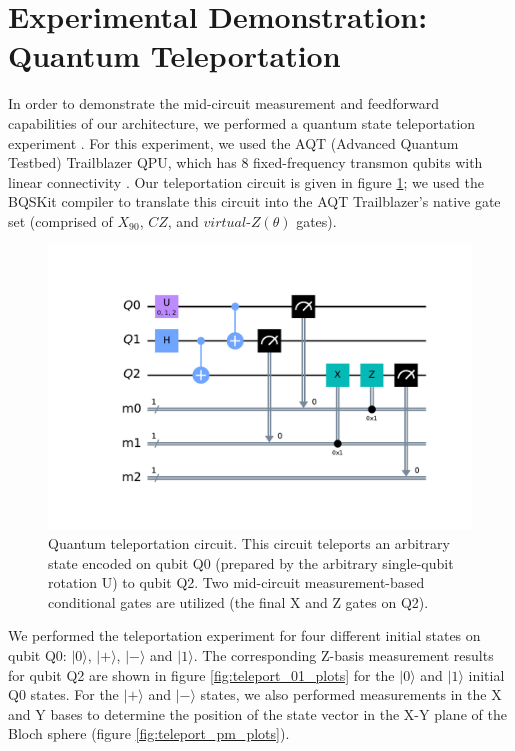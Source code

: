 \documentclass[journal]{IEEEtran}
\begin{document}
\section{Experimental Demonstration: Quantum Teleportation}

In order to demonstrate the mid-circuit measurement and feedforward capabilities of our architecture, we performed a quantum state teleportation experiment \cite{bennett1993teleporting}. For this experiment, we used the AQT (Advanced Quantum Testbed) Trailblazer QPU, which has 8 fixed-frequency transmon qubits with linear connectivity \cite{kreikebaum2020improving}. Our teleportation circuit is given in figure \ref{fig:teleport_circuit}; we used the BQSKit compiler \cite{younis2021bqskit} to translate this circuit into the AQT Trailblazer's native gate set (comprised of $X_{90}$, $CZ$, and $virtual$-$Z(\theta)$ gates).

\begin{figure}
    \centering
    \includegraphics[scale=0.5, trim={60 50 20 50}, clip]{figures/teleport_circuit.pdf}
    \caption{Quantum teleportation circuit. This circuit teleports an arbitrary state encoded on qubit Q0 (prepared by the arbitrary single-qubit rotation U) to qubit Q2. Two mid-circuit measurement-based conditional gates are utilized (the final X and Z gates on Q2).}
    \label{fig:teleport_circuit}
\end{figure}

We performed the teleportation experiment for four different initial states on qubit Q0: $| 0 \rangle$, $| + \rangle$, $| - \rangle$ and $| 1 \rangle$. The corresponding Z-basis measurement results for qubit Q2 are shown in figure \ref{fig:teleport_01_plots} for the $|0 \rangle$ and $|1 \rangle$ initial Q0 states. For the $| + \rangle$ and $| - \rangle$ states, we also performed measurements in the X and Y bases to determine the position of the state vector in the X-Y plane of the Bloch sphere (figure \ref{fig:teleport_pm_plots}).
\end{document}

